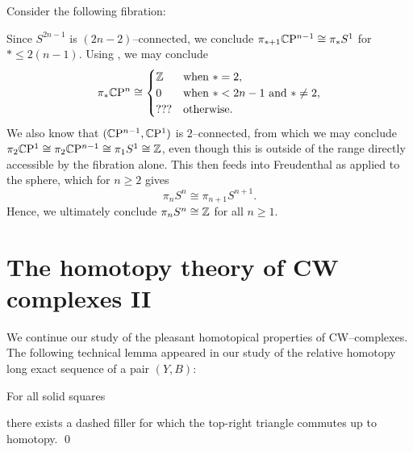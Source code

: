 \begin{example}\label{PinSnWithoutHurewicz}%
Consider the following fibration:%
\begin{center}
\end{center}
Since $S^{2n-1}$ is $(2n-2)$--connected, we conclude $\pi_{*+1} \mathbb C \mathrm{P}^{n-1} \cong \pi_* S^1$ for $* \le 2(n-1)$.
Using , we may conclude \[\pi_* \mathbb C \mathrm{P}^n \cong \begin{cases} \mathbb Z & \text{when $* = 2$}, \\ 0 & \text{when $* < 2n-1$ and $* \ne 2$}, \\ ??? & \text{otherwise}. \end{cases}\]
We also know that $(\mathbb C \mathrm{P}^{n-1}, \mathbb C \mathrm{P}^1)$ is $2$--connected, from which we may conclude $\pi_2 \mathbb C \mathrm{P}^1 \cong \pi_2 \mathbb C \mathrm{P}^{n-1} \cong \pi_1 S^1 \cong \mathbb Z$, even though this is outside of the range directly accessible by the fibration alone.
This then feeds into Freudenthal as applied to the sphere, which for $n \ge 2$ gives \[\pi_n S^n \cong \pi_{n+1} S^{n+1}.\]
Hence, we ultimately conclude $\pi_n S^n \cong \mathbb Z$ for all $n \ge 1$.
\end{example}




\section{The homotopy theory of CW complexes II}

We continue our study of the pleasant homotopical properties of CW--complexes.
The following technical lemma appeared in our study of the relative homotopy long exact sequence of a pair $(Y, B)$:
\begin{lemma}
For all solid squares
\begin{center}
\end{center}
there exists a dashed filler for which the top-right triangle commutes up to homotopy. \qed
{}
\end{lemma}

